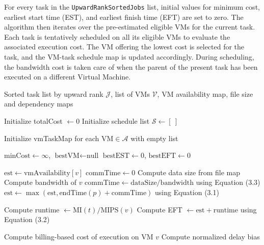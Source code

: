\documentclass[12pt]{tcc}
\begin{document}
For every task in the \texttt{UpwardRankSortedJobs} list, initial values for minimum cost, earliest start time (EST), and earliest finish time (EFT) are set to zero. The algorithm then iterates over the pre-estimated eligible VMs for the current task. Each task is tentatively scheduled on all its eligible VMs to evaluate the associated execution cost. The VM offering the lowest cost is selected for the task, and the VM-task schedule map is updated accordingly. During scheduling, the bandwidth cost is taken care of when the parent of the present task has been executed on a different Virtual Machine.

	\begin{algorithm}[H]
\caption{Task Scheduling with Cost Minimization}
\label{alg:scheduler}
\begin{algorithmic}[1]
\Require Sorted task list by upward rank \( \mathcal{J} \), list of VMs \( \mathcal{V} \),  VM availability map, file size and dependency maps

\State Initialize totalCost \( \gets 0 \)
\State Initialize schedule list \( \mathcal{S} \gets [\ ] \)

\State Initialize vmTaskMap for each \( \text{VM} \in \mathcal{A} \) with empty list

    \State \( \text{minCost} \gets \infty \), \( \text{bestVM} \gets \text{null} \)
    \State \( \text{bestEST} \gets 0 \), \( \text{bestEFT} \gets 0 \)

        \State \( \text{est} \gets \text{vmAvailability}[v] \)
                \State \( \text{commTime} \gets 0 \)
                    \State Compute data size from file map
                    \State Compute bandwidth of \( v \)
                    \State \( \text{commTime} \gets \text{dataSize} / \text{bandwidth} \) using Equation (3.3)
                \EndIf
                \State \( \text{est} \gets \max(\text{est}, \text{endTime}(p) + \text{commTime}) \)  using Equation (3.1)
                
            \EndIf
        \EndFor

        \)
        \State Compute runtime \( \gets \text{MI}(t) / \text{MIPS}(v) \)
        \State Compute EFT \( \gets \text{est} + \text{runtime} \) using Equation (3.2)

            \State Compute billing-based cost of execution on VM \( v \)
            \State Compute normalized delay bias


\end{algorithmic}
\end{algorithm}
\end{document}
